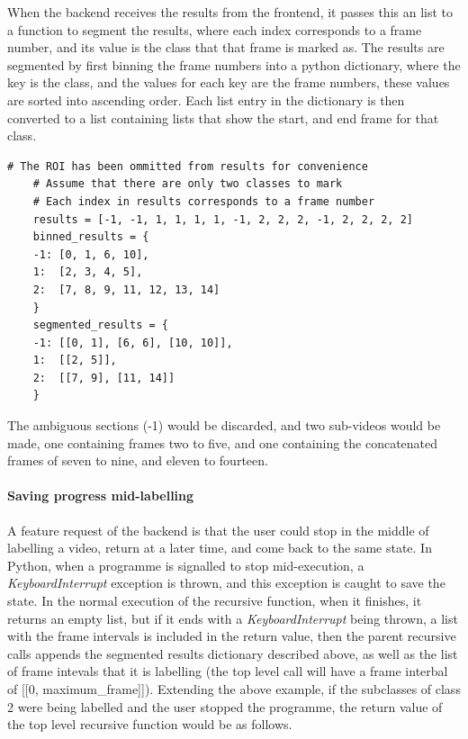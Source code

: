     When the backend receives the results from the frontend, it passes this an list to a function to segment the results, where each index corresponds to a frame number, and its value is the class that that frame is marked as. The results are segmented by first binning the frame numbers into a python dictionary, where the key is the class, and the values for each key are the frame numbers, these values are sorted into ascending order. Each list entry in the dictionary is then converted to a list containing lists that show the start, and end frame for that class.
    \begin{lstlisting}[style=PythonStyle]
    # The ROI has been ommitted from results for convenience
    # Assume that there are only two classes to mark
    # Each index in results corresponds to a frame number
    results = [-1, -1, 1, 1, 1, 1, -1, 2, 2, 2, -1, 2, 2, 2, 2]
    binned_results = {
    -1: [0, 1, 6, 10],
    1:  [2, 3, 4, 5],
    2:  [7, 8, 9, 11, 12, 13, 14]
    }
    segmented_results = {
    -1: [[0, 1], [6, 6], [10, 10]],
    1:  [[2, 5]],
    2:  [[7, 9], [11, 14]]
    }\end{lstlisting}
    The ambiguous sections (-1) would be discarded, and two sub-videos would be made, one containing frames two to five, and one containing the concatenated frames of seven to nine, and eleven to fourteen.

    \paragraph{Saving progress mid-labelling}
    A feature request of the backend is that the user could stop in the middle of labelling a video, return at a later time, and come back to the same state. In Python, when a programme is signalled to stop mid-execution, a {\slshape KeyboardInterrupt} exception is thrown, and this exception is caught to save the state. In the normal execution of the recursive function, when it finishes, it returns an empty list, but if it ends with a {\slshape KeyboardInterrupt} being thrown, a list with the frame intervals is included in the return value, then the parent recursive calls appends the segmented results dictionary described above, as well as the list of frame intevals that it is labelling (the top level call will have a frame interbal of [[0, maximum\_frame]]). Extending the above example, if the subclasses of class 2 were being labelled and the user stopped the programme, the return value of the top level recursive function would be as follows.

